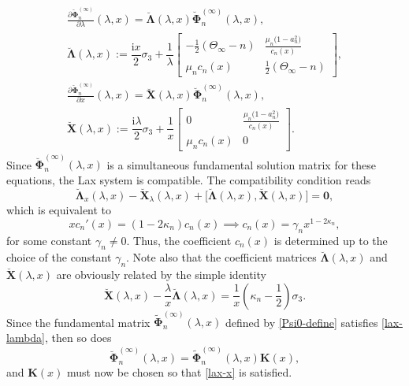\documentclass[pdftex]{sigma}
\numberwithin{equation}{section}
\newcommand{\ii}{\mathrm{i}}
\newcommand{\para}[1]{\breve{#1}}
\begin{document}
\begin{gather}
 \frac{\partial\para{\boldsymbol \Phi}_{n}^{(\infty)}}{\partial\lambda}(\lambda,x) =\para{\boldsymbol\Lambda}(\lambda,x) \para{\boldsymbol \Phi}_n^{(\infty)}(\lambda,x),\nonumber\\
 \para{\mathbf{\Lambda}}(\lambda,x):=\dfrac{\ii x}{2} \sigma_3 + \dfrac{1}{\lambda}\begin{bmatrix} -\frac{1}{2}(\Theta_\infty -n) & \displaystyle \frac{\mu_n\big(1-a_n^2\big)}{c_n(x)} \\ \mu_n c_n(x) & \frac{1}{2}(\Theta_\infty-n) \end{bmatrix}, \label{lax-lambda} \\
 \frac{\partial\para{\boldsymbol \Phi}_{n}^{(\infty)}}{\partial x}(\lambda,x) =\para{\mathbf X}(\lambda,x) \para{\boldsymbol \Phi}_n^{(\infty)}(\lambda,x),\nonumber\\
 \para{\mathbf{X}}(\lambda,x):= \dfrac{\ii\lambda}{2} \sigma_3 + \dfrac{1}{x}\begin{bmatrix} 0 & \displaystyle \frac{\mu_n\big(1-a_n^2\big)}{c_n(x)} \\ \mu_n c_n(x) & 0 \end{bmatrix}. \label{lax-x}
\end{gather}
Since $\para{\boldsymbol\Phi}_n^{(\infty)}(\lambda,x)$ is a simultaneous fundamental solution matrix for these equations, the Lax system is compatible. The compatibility condition reads
\begin{equation*}
 \para{\boldsymbol\Lambda}_{x}(\lambda,x) - \para{\mathbf X}_{\lambda}(\lambda,x) + \big[\para{\boldsymbol{\Lambda}}(\lambda,x), \para{\mathbf X}(\lambda,x)\big] = \mathbf{0},
\end{equation*}
which is equivalent to
\begin{equation}
 xc_n'(x) = (1-2\kappa_n) c_n(x) \implies c_n(x) = \gamma_n x^{1-2\kappa_n},
 \label{c-of-x}
\end{equation}
for some constant $\gamma_n\neq 0$. Thus, the coefficient $c_n(x)$ is determined up to the choice of the constant $\gamma_n$. Note also that the coefficient matrices $\para{\boldsymbol{\Lambda}}(\lambda,x)$ and $\para{\mathbf{X}}(\lambda,x)$ are obviously related by the simple identity
\begin{equation}
 \para{\mathbf{X}}(\lambda,x)-\frac{\lambda}{x}\para{\boldsymbol\Lambda}(\lambda,x)=\frac{1}{x}\left(\kappa_n-\frac{1}{2}\right)\sigma_3.
 \label{XLambda-relation}
\end{equation}
\sloppy Since the fundamental matrix $\widetilde{\boldsymbol \Phi}_n^{(\infty)}(\lambda,x)$ defined by \eqref{Psi0-define} satisfies \eqref{lax-lambda}, then so does \[\para{\boldsymbol \Phi}_n^{(\infty)}(\lambda,x)=\widetilde{\boldsymbol\Phi}_n^{(\infty)}(\lambda,x) \mathbf K(x),\] and $\mathbf K(x)$ must now be chosen so that \eqref{lax-x} is satisfied.
\end{document}
